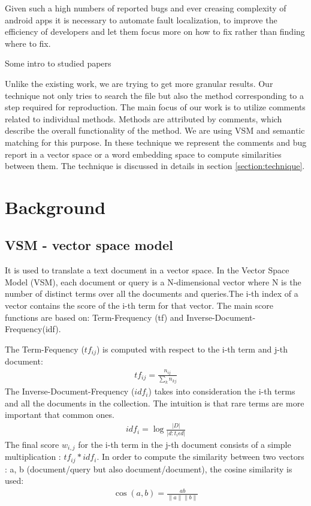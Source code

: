 \documentclass[sigconf]{acmart}
\begin{document}
Given such a high numbers of reported bugs and ever creasing complexity of android apps it is necessary to automate fault localization, to improve the efficiency of developers and let them focus more on how to fix rather than finding where to fix.

Some intro to studied papers

Unlike the existing work, we are trying to get more granular results. Our technique not only tries to search the file but also the method corresponding to a step required for reproduction. The main focus of our work is to utilize comments related to individual methods. Methods are attributed by comments,  which describe the overall functionality of the method. We are using VSM and semantic matching for this purpose. In these technique we represent the comments and bug report in a vector space or a word embedding space to compute similarities between them. The technique is discussed in details in section \ref{section:technique}.

\section{Background}
\subsection{VSM - vector space model}
It is used to translate a text document in a vector space. In the Vector Space Model (VSM), each document or query is a N-dimensional vector where N is the number of distinct terms over all the documents and queries.The i-th index of a vector contains the score of the i-th term for that vector. The main score functions are based on: Term-Frequency (tf) and Inverse-Document-Frequency(idf).

The Term-Fequency ($tf_{ij}$) is computed with respect to the i-th term and j-th document:
\begin{gather*}
	tf_{ij} = \frac{n_{ij}}{\sum_k n_{kj}}
\end{gather*}
The Inverse-Document-Frequency ($idf_{i}$) takes into consideration the i-th terms and all the documents in the collection. The intuition is that rare terms are more important that common ones.
\begin{gather*}
	idf_{i} = \log{ \frac{|D|}{|d: t_i\epsilon d|} }
\end{gather*}
The final score $w_{i, j}$ for the i-th term in the j-th document consists of a simple multiplication : $tf_{ij}*idf_{i}$. In order to compute the similarity between two vectors : a, b (document/query but also document/document), the cosine similarity is used:
\begin{gather*}
	\cos(a,b) = \frac{ab}{\|a\|\|b\|}
\end{gather*}
\end{document}
